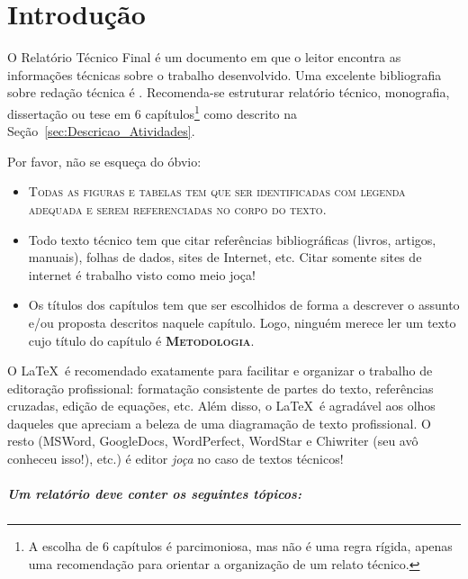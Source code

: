 \graphicspath{{figuras/}}

\chapter{Introdução \label{cap1}}

O Relatório Técnico Final é um documento em que o leitor encontra  as informações técnicas sobre o trabalho desenvolvido. Uma excelente bibliografia sobre redação técnica é \cite{Markel1994}. Recomenda-se  estruturar relatório técnico, monografia, dissertação  ou tese em  6 capítulos\footnote{A escolha de 6 capítulos é parcimoniosa, mas não é uma regra rígida, apenas uma recomendação para orientar a organização de um relato técnico.} como descrito na Seção~\ref{sec:Descricao_Atividades}. 

Por favor, não se esqueça do óbvio:
\begin{itemize}
	\item  \textsc{\color{red!50!black} Todas as figuras e tabelas tem que ser identificadas com legenda adequada e serem referenciadas no corpo do texto}.
	\item Todo texto técnico tem que citar referências bibliográficas (livros, artigos, manuais), folhas de dados, sites de Internet, etc. Citar somente sites de internet é trabalho visto como meio joça!
	\item Os títulos dos capítulos tem que ser escolhidos de forma a descrever o assunto e/ou proposta descritos naquele capítulo. Logo, ninguém merece ler um texto cujo  título do capítulo é \textbf{\textsc{Metodologia}}.
\end{itemize} 

O \LaTeX  \, é recomendado exatamente para facilitar e organizar o trabalho de editoração  profissional: formatação consistente de partes do texto, referências cruzadas, edição de equações, etc. Além disso, o \LaTeX \, é agradável aos olhos daqueles que apreciam a beleza de uma diagramação de texto profissional. O resto (MSWord, GoogleDocs, WordPerfect, WordStar e  Chiwriter (seu avô conheceu isso!), etc.) é editor \emph{joça} no caso de textos  técnicos!



\paragraph{Um relatório deve conter os seguintes tópicos:}

